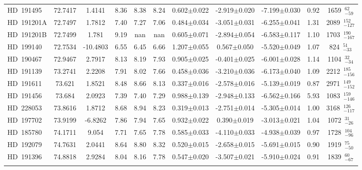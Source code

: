 {\begin{longtable}{lcccccccccc}
\noalign{\smallskip}
HD~191495 & 72.7417 & 1.4141 & 8.36 & 8.38 & 8.24 & 0.602$\pm$0.022 & -2.919$\pm$0.020 & -7.199$\pm$0.030 & 0.92 & 1659~$_{-59}^{62}$ \\
\noalign{\smallskip}
HD~191201A & 72.7497 & 1.7812 & 7.40 & 7.27 & 7.06 & 0.484$\pm$0.034 & -3.051$\pm$0.031 & -6.255$\pm$0.041 & 1.31 & 2089~$_{-127}^{152}$ \\
\noalign{\smallskip}
HD~191201B & 72.7499 & 1.781 & 9.19 & nan & nan & 0.605$\pm$0.071 & -2.894$\pm$0.054 & -6.583$\pm$0.117 & 1.10 & 1703~$_{-167}^{190}$ \\
\noalign{\smallskip}
HD~199140 & 72.7534 & -10.4803 & 6.55 & 6.45 & 6.66 & 1.207$\pm$0.055 & 0.567$\pm$0.050 & -5.520$\pm$0.049 & 1.07 & 824~$_{-33}^{51}$ \\
\noalign{\smallskip}
HD~190467 & 72.9467 & 2.7917 & 8.13 & 8.19 & 7.93 & 0.905$\pm$0.025 & -0.401$\pm$0.025 & -6.001$\pm$0.028 & 1.14 & 1104~$_{-34}^{32}$ \\
\noalign{\smallskip}
HD~191139 & 73.2741 & 2.2208 & 7.91 & 8.02 & 7.66 & 0.458$\pm$0.036 & -3.210$\pm$0.036 & -6.173$\pm$0.040 & 1.09 & 2212~$_{-156}^{185}$ \\
\noalign{\smallskip}
HD~191611 & 73.621 & 1.8521 & 8.48 & 8.66 & 8.13 & 0.337$\pm$0.016 & -2.578$\pm$0.016 & -5.139$\pm$0.019 & 0.87 & 2971~$_{-152}^{149}$ \\
\noalign{\smallskip}
HD~191456 & 73.684 & 2.0923 & 7.39 & 7.40 & 7.29 & 0.988$\pm$0.139 & -2.948$\pm$0.133 & -6.562$\pm$0.166 & 5.93 & 1083~$_{-146}^{159}$ \\
\noalign{\smallskip}
HD~228053 & 73.8616 & 1.8712 & 8.68 & 8.94 & 8.23 & 0.319$\pm$0.013 & -2.751$\pm$0.014 & -5.305$\pm$0.014 & 1.00 & 3168~$_{-117}^{126}$ \\
\noalign{\smallskip}
HD~197702 & 73.9199 & -6.8262 & 7.86 & 7.94 & 7.65 & 0.932$\pm$0.022 & 0.390$\pm$0.019 & -3.013$\pm$0.021 & 1.04 & 1072~$_{-26}^{31}$ \\
\noalign{\smallskip}
HD~185780 & 74.1711 & 9.054 & 7.71 & 7.65 & 7.78 & 0.585$\pm$0.033 & -4.110$\pm$0.033 & -4.938$\pm$0.039 & 0.97 & 1728~$_{-96}^{104}$ \\
\noalign{\smallskip}
HD~192079 & 74.7631 & 2.0441 & 8.64 & 8.80 & 8.32 & 0.520$\pm$0.015 & -2.658$\pm$0.015 & -5.691$\pm$0.015 & 0.90 & 1919~$_{-50}^{75}$ \\
\noalign{\smallskip}
HD~191396 & 74.8818 & 2.9284 & 8.04 & 8.16 & 7.78 & 0.547$\pm$0.020 & -3.507$\pm$0.021 & -5.910$\pm$0.024 & 0.91 & 1839~$_{-67}^{60}$ \\
\noalign{\smallskip}

\end{longtable}}
